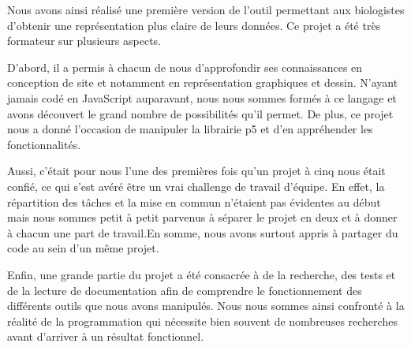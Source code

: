 Nous avons ainsi réalisé une première version de l’outil permettant aux biologistes d'obtenir une représentation plus claire de leurs données. Ce projet a été très formateur sur plusieurs aspects. 

D’abord, il a permis à chacun de nous d’approfondir ses connaissances en conception de site et notamment en représentation graphiques et dessin. N’ayant jamais codé en JavaScript auparavant, nous nous sommes formés à ce langage et avons découvert le grand nombre de possibilités qu’il permet. De plus, ce projet nous a donné l’occasion de manipuler la librairie p5 et d’en appréhender les fonctionnalités. 

Aussi, c’était pour nous l’une des premières fois qu’un projet à cinq nous était confié, ce qui s’est avéré être un vrai challenge de travail d’équipe. En effet, la répartition des  tâches et la mise en commun n’étaient pas évidentes au début mais nous sommes petit à petit parvenus à séparer le projet en deux et à donner à chacun une part de travail.En somme, nous avons surtout appris à partager du code au sein d’un même projet.

Enfin, une grande partie du projet a été consacrée à de la recherche, des tests et de la lecture de documentation afin de comprendre le fonctionnement des différents outils que nous avons manipulés. Nous nous sommes ainsi confronté à la réalité de la programmation qui nécessite bien souvent de nombreuses recherches avant d’arriver à un résultat fonctionnel.

